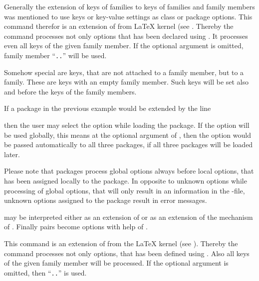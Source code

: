 \begin{Declaration}
\end{Declaration}
%
Generally the extension of keys of families to keys of families and family
members was mentioned to use keys or key-value settings as class or package
options. This command therefor is an extension of  from
\LaTeX{} kernel (see \cite{latex:clsguide}. Thereby the command processes not
only options that has been declared using . It processes
even all keys of the given family member. If the optional argument
 is omitted, family member
``\texttt{.}\texttt{.}'' will be used.

Somehow special are keys, that are not attached to a family member, but to a
family. These are keys with an empty family member. Such keys will be set also
and before the keys of the family members.
\begin{Example}
  If a package in the previous example would be extended by the line
\begin{lstcode}
\end{lstcode}
  then the user may select the option  while loading the
  package. If the option will be used globally, this means at the optional
  argument of , then the option would be passed
  automatically to all three packages, if all three packages will be loaded
  later.
\end{Example}
Please note that packages process global options always
before local options, that has been assigned locally to the package. In
opposite to unknown options while processing of global options, that will only
result in an information in the -file, unknown options assigned to
the package result in error messages.

 may be interpreted either as an extension of
 or as an extension of the  mechanism
of . Finally  pairs become options with help
of .%
%
%


\begin{Declaration}
\end{Declaration}
%
This command is an extension of  from the \LaTeX{}
kernel (see \cite{latex:clsguide}). Thereby the command processes not only
options, that has been defined using . Also all keys of
the given family member will be processed. If the optional argument
 is omitted, then
``\texttt{.}\texttt{.}'' is used.

